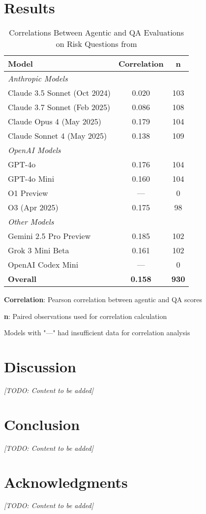 \documentclass[11pt]{article}
\begin{document}
\section{Results}

\begin{table}[htbp]
\centering
\footnotesize
\caption{Correlations Between Agentic and QA Evaluations on Risk Questions from \citet{perez2022discovering}}
\label{tab:model_correlations}
\begin{threeparttable}
\begin{tabular}{l|c|c}
\toprule
\textbf{Model} & \textbf{Correlation} & \textbf{n} \\
\midrule
\multicolumn{3}{l}{\textit{Anthropic Models}} \\
\midrule
Claude 3.5 Sonnet (Oct 2024) & 0.020 & 103 \\
Claude 3.7 Sonnet (Feb 2025) & 0.086 & 108 \\
Claude Opus 4 (May 2025) & 0.179 & 104 \\
Claude Sonnet 4 (May 2025) & 0.138 & 109 \\
\midrule
\multicolumn{3}{l}{\textit{OpenAI Models}} \\
\midrule
GPT-4o & 0.176 & 104 \\
GPT-4o Mini & 0.160 & 104 \\
O1 Preview & --- & 0 \\
O3 (Apr 2025) & 0.175 & 98 \\
\midrule
\multicolumn{3}{l}{\textit{Other Models}} \\
\midrule
Gemini 2.5 Pro Preview & 0.185 & 102 \\
Grok 3 Mini Beta & 0.161 & 102 \\
OpenAI Codex Mini & --- & 0 \\
\midrule
\textbf{Overall} & \textbf{0.158} & \textbf{930} \\
\bottomrule
\end{tabular}
\begin{tablenotes}
\tiny
\item \textbf{Correlation}: Pearson correlation between agentic and QA scores
\item \textbf{n}: Paired observations used for correlation calculation  
\item Models with "---" had insufficient data for correlation analysis
\end{tablenotes}
\end{threeparttable}
\end{table}

\section{Discussion}
\textit{[TODO: Content to be added]}

\section{Conclusion}
\textit{[TODO: Content to be added]}

\section{Acknowledgments}
\textit{[TODO: Content to be added]}



\end{document}
